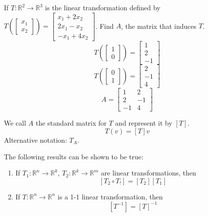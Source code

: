 \documentclass[12pt]{article}
\begin{document}
\begin{example} If $T: \mathbb{R}^2 \to \mathbb{R}^3$ is the linear transformation defined by $T(\begin{bmatrix} x_1 \\ x_2 \end{bmatrix}) = \begin{bmatrix} x_1 + 2x_2 \\ 2x_1 - x_2 \\ -x_1 + 4x_2 \end{bmatrix} $. Find $A$, the matrix that induces $T$. $$T(\begin{bmatrix} 1 \\ 0 \end{bmatrix}) = \begin{bmatrix} 1 \\ 2 \\ -1 \end{bmatrix} $$ $$T(\begin{bmatrix} 0 \\ 1 \end{bmatrix}) = \begin{bmatrix} 2 \\ -1 \\ 4 \end{bmatrix} $$ $$A = \begin{bmatrix} 1 & 2 \\ 2 & -1 \\ -1 & 4 \end{bmatrix} $$ \end{example} 
\begin{definition} We call $A$ the standard matrix for $T$ and represent it by $[T]$.$$T(v) = [T]v$$ Alternative notation: $T_A$. \end{definition} 
The following results can be shown to be true: \begin{enumerate} 
\item If $T_1: \mathbb{R}^n \to \mathbb{R}^k$, $T_2: \mathbb{R}^k \to \mathbb{R}^m$ are linear transformations, then $$[T_2 \circ T_!] = [T_2][T_1] $$ 
\item If $T: \mathbb{R}^n \to \mathbb{R}^n$ is a 1-1 linear transformation, then $$[T^{-1}] = [T]^{-1} $$ \end{enumerate} 
\end{document}
